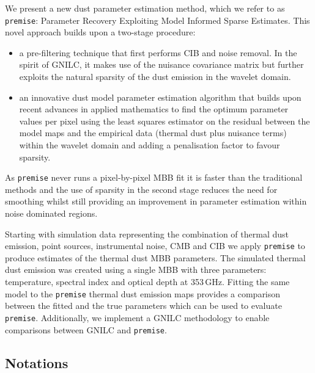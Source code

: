\documentclass[a4paper,fleqn,usenatbib]{mnras}
\begin{document}
We present a new dust parameter estimation method, which we refer to as {\texttt{premise}}: Parameter Recovery Exploiting Model Informed Sparse Estimates. This novel approach builds upon a two-stage procedure:
\begin{itemize}
\item a pre-filtering technique that first performs CIB and noise removal. In the spirit of GNILC, it makes use of the nuisance covariance matrix but further exploits the natural sparsity of the dust emission in the wavelet domain.\\

\item an innovative dust model parameter estimation algorithm that builds upon recent advances in applied mathematics to find the optimum parameter values per pixel using the least squares estimator on the residual between the model maps and the empirical data (thermal dust plus nuisance terms) within the wavelet domain and adding a penalisation factor to favour sparsity.
\end{itemize} 
As {\texttt{premise}} never runs a pixel-by-pixel MBB fit it is faster than the traditional methods and the use of sparsity in the second stage reduces the need for smoothing whilst still providing an improvement in parameter estimation within noise dominated regions. 

Starting with simulation data representing the combination of thermal dust emission, point sources, instrumental noise, CMB and CIB we apply {\texttt{premise}} to produce estimates of the thermal dust MBB parameters. The simulated thermal dust emission was created using a single MBB with three parameters: temperature, spectral index and optical depth at 353\,GHz. Fitting the same model to the {\texttt{premise}} thermal dust emission maps provides a comparison between the fitted and the true parameters which can be used to evaluate {\texttt{premise}}. Additionally, we implement a GNILC methodology \citep{gnilc} to enable comparisons between GNILC and {\texttt{premise}}.

\subsection{Notations}
\end{document}
